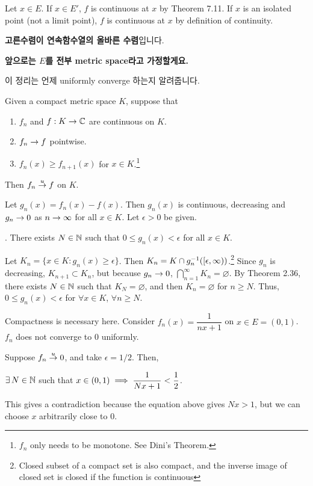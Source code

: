 \pf Let \(x \in E\). If \(x \in E'\), \(f\) is continuous at \(x\) by Theorem 7.11. If \(x\) is an isolated point (not a limit point), \(f\) is continuous at \(x\) by definition of continuity.

\textbf{고른수렴이 연속함수열의 올바른 수렴}입니다.

\textbf{앞으로는 \(E\)를 전부 metric space라고 가정할게요.}

이 정리는 언제 uniformly converge 하는지 알려줍니다.

 Given a compact metric space \(K\), suppose that
\begin{enumerate}
    \item \(f_n\) and \(f: K \rightarrow \mathbb{C}\) are continuous on \(K\).
    \item \(f_n \rightarrow f\) pointwise.
    \item \(f_n(x) \geq f_{n+1}(x)\) for \(x \in K\).\footnote{\(f_n\) only needs to be monotone. See Dini's Theorem.}
\end{enumerate}
Then \(f_n \overset{u}{\rightarrow} f\) on \(K\).

\pf Let \(g_n(x) = f_n(x) - f(x)\). Then \(g_n(x)\) is continuous, decreasing and \(g_n \rightarrow 0\) as \(n \rightarrow \infty\) for all \(x \in K\). Let \(\epsilon > 0\) be given.

\quad \claim. There exists \(N \in \mathbb{N}\) such that \(0 \leq g_n(x) < \epsilon\) for all \(x \in K\).

\quad \pf Let \(K_n = \{x \in K : g_n(x)\geq \epsilon\}\). Then \(K_n = K \cap g_n^{-1} ([\epsilon, \infty))\).\footnote{Closed subset of a compact set is also compact, and the inverse image of closed set is closed if the function is continuous} Since \(g_n\) is decreasing, \(K_{n+1}\subset K_n\), but because \(g_n \rightarrow 0\), \(\bigcap_{n=1}^\infty K_n = \varnothing\). By Theorem 2.36, there exists \(N \in \mathbb{N}\) such that \(K_N = \varnothing\), and then \(K_n = \varnothing\) for \(n \geq N\). Thus, \(0 \leq g_n(x) < \epsilon\) for \(\forall x \in K\), \(\forall n \geq N\).

\rmk Compactness is necessary here. Consider \(f_n(x) = \dfrac{1}{nx + 1}\) on \(x \in E = (0, 1)\). \(f_n\) does not converge to \(0\) uniformly.

\pf Suppose \(f_n \overset{u}{\rightarrow} 0\), and take \(\epsilon = 1/2\). Then,
\begin{center}
    \(\exists N \in \N\) such that \(\displaystyle x \in (0, 1) \implies \frac{1}{Nx + 1} < \frac{1}{2}\).
\end{center}
This gives a contradiction because the equation above gives \(Nx > 1\), but we can choose \(x\) arbitrarily close to \(0\).

